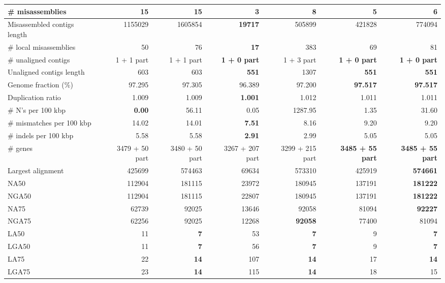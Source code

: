 \documentclass[12pt,a4paper]{article}
\begin{document}
\begin{table}[ht]
\begin{center}
\begin{tabular}{|l*{6}{|r}|}
\# misassemblies & 15 & 15 & {\bf 3} & 8 & 5 & 6 \\ \hline
Misassembled contigs length & 1155029 & 1605854 & {\bf 19717} & 505899 & 421828 & 774094 \\ \hline
\# local misassemblies & 50 & 76 & {\bf 17} & 383 & 69 & 81 \\ \hline
\# unaligned contigs & 1 + 1 part & 1 + 1 part & {\bf 1 + 0 part} & 1 + 3 part & {\bf 1 + 0 part} & {\bf 1 + 0 part} \\ \hline
Unaligned contigs length & 603 & 603 & {\bf 551} & 1307 & {\bf 551} & {\bf 551} \\ \hline
Genome fraction (\%) & 97.295 & 97.305 & 96.389 & 97.200 & {\bf 97.517} & {\bf 97.517} \\ \hline
Duplication ratio & 1.009 & 1.009 & {\bf 1.001} & 1.012 & 1.011 & 1.011 \\ \hline
\# N's per 100 kbp & {\bf 0.00} & 56.11 & 0.05 & 1287.95 & 1.35 & 31.60 \\ \hline
\# mismatches per 100 kbp & 14.02 & 14.01 & {\bf 7.51} & 8.16 & 9.20 & 9.20 \\ \hline
\# indels per 100 kbp & 5.58 & 5.58 & {\bf 2.91} & 2.99 & 5.05 & 5.05 \\ \hline
\# genes & 3479 + 50 part & 3480 + 50 part & 3267 + 207 part & 3299 + 215 part & {\bf 3485 + 55 part} & {\bf 3485 + 55 part} \\ \hline
Largest alignment & 425699 & 574463 & 69634 & 573310 & 425919 & {\bf 574661} \\ \hline
NA50 & 112904 & 181115 & 23972 & 180945 & 137191 & {\bf 181222} \\ \hline
NGA50 & 112904 & 181115 & 22807 & 180945 & 137191 & {\bf 181222} \\ \hline
NA75 & 62739 & 92025 & 13646 & 92058 & 81094 & {\bf 92227} \\ \hline
NGA75 & 62256 & 92025 & 12268 & {\bf 92058} & 77400 & 81094 \\ \hline
LA50 & 11 & {\bf 7} & 53 & {\bf 7} & 9 & {\bf 7} \\ \hline
LGA50 & 11 & {\bf 7} & 56 & {\bf 7} & 9 & {\bf 7} \\ \hline
LA75 & 22 & {\bf 14} & 107 & {\bf 14} & 17 & {\bf 14} \\ \hline
LGA75 & 23 & {\bf 14} & 115 & {\bf 14} & 18 & 15 \\ \hline
\end{tabular}
\end{center}
\end{table}
\end{document}
